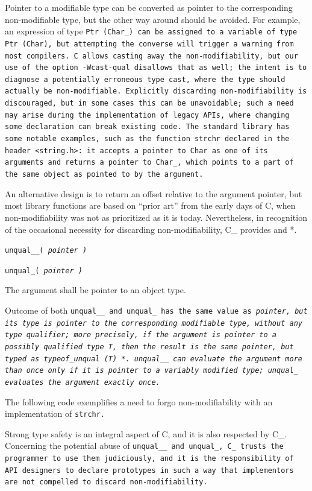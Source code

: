 Pointer to a modifiable type can be converted as pointer to the corresponding
non-modifiable type, but the other way around should be avoided.
For example, an expression of type \tt{Ptr (Char_)}
can be assigned to a variable of type \tt{Ptr (Char)},
but attempting the converse will trigger a warning from most compilers.
C allows casting away the non-modifiability, but our use of the option
\tt{-Wcast-qual} disallows that as well; the intent is to diagnose a potentially
erroneous type cast, where the type should actually be non-modifiable.
Explicitly discarding non-modifiability is discouraged, but in some
cases this can be unavoidable; such a need may arise during the implementation
of legacy APIs, where changing some declaration can break existing code.
The standard library has some notable examples, such as the function
\tt{strchr} declared in the header \tt{<string.h>}: it accepts a pointer
to \tt{Char} as one of its arguments and returns a pointer to \tt{Char_},
which points to a part of the same object as pointed to by the argument.

An alternative design is to return an offset relative to the argument pointer,
but most library functions are based on ``prior art'' from the early days of C,
when non-modifiability was not as prioritized as it is today.
Nevertheless, in recognition of the occasional necessity for discarding
non-modifiability, C\_ provides  and *.


\tt{unqual_}\_\s\tt{(} \it{pointer} \tt{)}

\tt{unqual_}\s\s\tt{(} \it{pointer} \tt{)}


The argument shall be pointer to an object type.


Outcome of both \tt{unqual__} and \tt{unqual_} has the same value as
\it{pointer}, but its type is pointer to the corresponding modifiable type,
without any type qualifier; more precisely, if the argument is pointer
to a possibly qualified type \tt{T}, then the result is the same pointer,
but typed as \tt{typeof_unqual (T) *}.
\tt{unqual__} can evaluate the argument more than once only if it is pointer
to a variably modified type; \tt{unqual_} evaluates the argument exactly once.

\example The following code exemplifies a need to forgo
non-modifiability with an implementation of \tt{strchr}.


\note Strong type safety is an integral aspect of C,
and it is also respected by C\_.
Concerning the potential abuse of \tt{unqual__} and \tt{unqual_},
C\_ trusts the programmer to use them judiciously,
and it is the responsibility of API designers to declare prototypes in
such a way that implementors are not compelled to discard non-modifiability.
